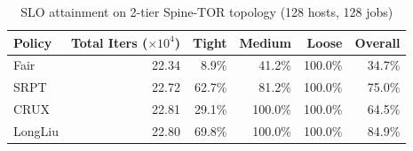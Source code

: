 \begin{table}[t]
\centering
\caption{SLO attainment on 2-tier Spine-TOR topology (128 hosts, 128 jobs)}
\label{tab:twotier}
\begin{tabular}{l|r|r|r|r|r}
\hline
Policy & Total Iters ($\times 10^4$) & Tight & Medium & Loose & Overall \\
\hline
Fair & 22.34 & 8.9\% & 41.2\% & 100.0\% & 34.7\% \\
SRPT & 22.72 & 62.7\% & 81.2\% & 100.0\% & 75.0\% \\
CRUX & 22.81 & 29.1\% & 100.0\% & 100.0\% & 64.5\% \\
LongLiu & 22.80 & 69.8\% & 100.0\% & 100.0\% & 84.9\% \\
\hline
\end{tabular}
\end{table}
